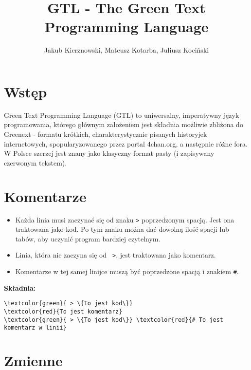 \documentclass{article}
\title{GTL - The Green Text Programming Language}
\author{Jakub Kierznowski, Mateusz Kotarba, Juliusz Kociński}
\begin{document}
\maketitle


\section{Wstęp}
Green Text Programming Language (GTL) to uniwersalny, imperatywny język programowania, którego głównym założeniem jest składnia możliwie zbliżona do Greenext - formatu krótkich, charakterystycznie pisanych historyjek internetowych, spopularyzowanego przez portal 4chan.org, a następnie różne fora. W Polsce szerzej jest znany jako klasyczny format pasty (i zapisywany czerwonym tekstem).

\section{Komentarze}

\begin{itemize}
    \item Każda linia musi zaczynać się od znaku \texttt{>} poprzedzonym spacją. Jest ona traktowana jako kod. Po tym znaku można dać dowolną ilość spacji lub tabów, aby uczynić program bardziej czytelnym.
    \item Linia, która nie zaczyna się od \texttt{ >}, jest traktowana jako komentarz.
    \item Komentarze w tej samej linijce muszą być poprzedzone spacją i znakiem \texttt{\#}.
\end{itemize}


\textbf{Składnia:}
\begin{Verbatim}[commandchars=\\\{\}]
\textcolor{green}{ > \{To jest kod\}}
\textcolor{red}{To jest komentarz}
\textcolor{green}{ > \{To jest kod\}} \textcolor{red}{# To jest komentarz w linii}
\end{Verbatim}

\section{Zmienne}
\end{document}
